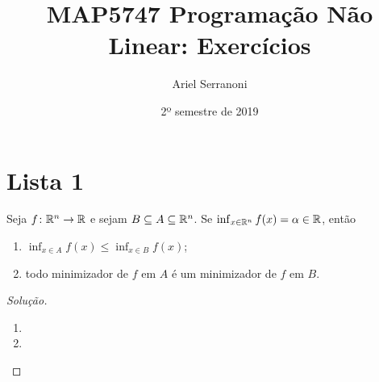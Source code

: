 \documentclass[12pt,twoside,a4paper]{book}
\title{MAP5747 Programação Não Linear: Exercícios}
\author{Ariel Serranoni}
\date{2º semestre de 2019}
\begin{document}
\maketitle

\chapter*{Lista 1}
\begin{problema}
Seja \(f\colon\mathbb{R}^n\to\mathbb{R}\) e sejam \(B\subseteq A\subseteq\mathbb{R}^n\). Se
\(\inf_{x\in\mathbb{R}^n}f(x)=\alpha\in\mathbb{R}\), então
\begin{enumerate}[label=(\roman*)]
\item \(\inf_{x\in A}f(x)\leq\inf_{x\in B}f(x)\);
\item todo minimizador de \(f\) em \(A\) é um minimizador de \(f\) em \(B\).
\end{enumerate}
\end{problema}
\begin{proof}[Solução]\hfill
  \begin{enumerate}[label=(\roman*)]
  \item
  \item
    \end{enumerate}
\end{proof}
\end{document}
